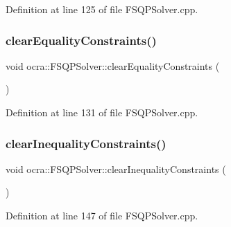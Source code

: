 Definition at line 125 of file F\+S\+Q\+P\+Solver.\+cpp.

\hypertarget{classocra_1_1FSQPSolver_af03bfb0f28ff313b79c9d65986a443b1}{}\label{classocra_1_1FSQPSolver_af03bfb0f28ff313b79c9d65986a443b1} 
\subsubsection{\texorpdfstring{clear\+Equality\+Constraints()}{clearEqualityConstraints()}}
{\footnotesize\ttfamily void ocra\+::\+F\+S\+Q\+P\+Solver\+::clear\+Equality\+Constraints (\begin{DoxyParamCaption}{ }\end{DoxyParamCaption})}



Definition at line 131 of file F\+S\+Q\+P\+Solver.\+cpp.

\hypertarget{classocra_1_1FSQPSolver_a45e3e41dfac944a74e85191078e979b4}{}\label{classocra_1_1FSQPSolver_a45e3e41dfac944a74e85191078e979b4} 
\subsubsection{\texorpdfstring{clear\+Inequality\+Constraints()}{clearInequalityConstraints()}}
{\footnotesize\ttfamily void ocra\+::\+F\+S\+Q\+P\+Solver\+::clear\+Inequality\+Constraints (\begin{DoxyParamCaption}{ }\end{DoxyParamCaption})}



Definition at line 147 of file F\+S\+Q\+P\+Solver.\+cpp.

\hypertarget{classocra_1_1FSQPSolver_a41a84fdd4c110d93043da6cf524beb31}{}\label{classocra_1_1FSQPSolver_a41a84fdd4c110d93043da6cf524beb31} 
